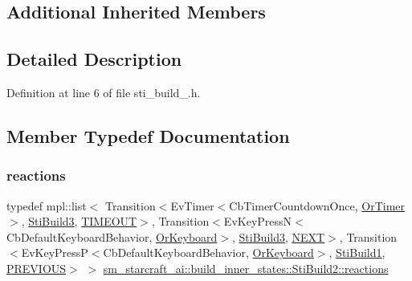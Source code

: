 \subsection*{Additional Inherited Members}


\subsection{Detailed Description}


Definition at line 6 of file sti\+\_\+build\+\_.\+h.



\subsection{Member Typedef Documentation}
\mbox{\label{structsm__starcraft__ai_1_1build__inner__states_1_1StiBuild2_ab615bc2995682a7a80cdf4d5ddcad22c}} 
\subsubsection{\texorpdfstring{reactions}{reactions}}
{\footnotesize\ttfamily typedef mpl\+::list$<$ Transition$<$Ev\+Timer$<$Cb\+Timer\+Countdown\+Once, \hyperlink{classsm__starcraft__ai_1_1OrTimer}{Or\+Timer}$>$, \hyperlink{structsm__starcraft__ai_1_1build__inner__states_1_1StiBuild3}{Sti\+Build3}, \hyperlink{structsm__starcraft__ai_1_1build__inner__states_1_1StiBuild2_1_1TIMEOUT}{T\+I\+M\+E\+O\+UT}$>$, Transition$<$Ev\+Key\+PressN$<$Cb\+Default\+Keyboard\+Behavior, \hyperlink{classsm__starcraft__ai_1_1OrKeyboard}{Or\+Keyboard}$>$, \hyperlink{structsm__starcraft__ai_1_1build__inner__states_1_1StiBuild3}{Sti\+Build3}, \hyperlink{structsm__starcraft__ai_1_1build__inner__states_1_1StiBuild2_1_1NEXT}{N\+E\+XT}$>$, Transition$<$Ev\+Key\+PressP$<$Cb\+Default\+Keyboard\+Behavior, \hyperlink{classsm__starcraft__ai_1_1OrKeyboard}{Or\+Keyboard}$>$, \hyperlink{structsm__starcraft__ai_1_1build__inner__states_1_1StiBuild1}{Sti\+Build1}, \hyperlink{structsm__starcraft__ai_1_1build__inner__states_1_1StiBuild2_1_1PREVIOUS}{P\+R\+E\+V\+I\+O\+US}$>$ $>$ \hyperlink{structsm__starcraft__ai_1_1build__inner__states_1_1StiBuild2_ab615bc2995682a7a80cdf4d5ddcad22c}{sm\+\_\+starcraft\+\_\+ai\+::build\+\_\+inner\+\_\+states\+::\+Sti\+Build2\+::reactions}}



